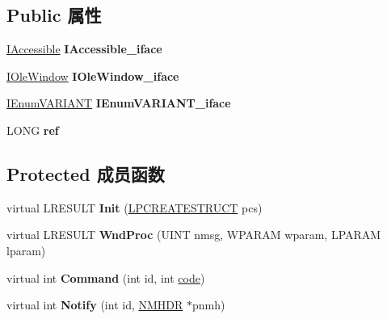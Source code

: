 \subsection*{Public 属性}
\begin{DoxyCompactItemize}
\item 
\mbox{\label{struct_window_a288cd127989ddf75b619b40c3e60745b}} 
\hyperlink{interface_i_accessible}{I\+Accessible} {\bfseries I\+Accessible\+\_\+iface}
\item 
\mbox{\label{struct_window_ab71f20b9836a12217826427101a7017d}} 
\hyperlink{interface_i_ole_window}{I\+Ole\+Window} {\bfseries I\+Ole\+Window\+\_\+iface}
\item 
\mbox{\label{struct_window_a4f1f352ac3ffb7cf71b9df651acd2923}} 
\hyperlink{interface_i_enum_v_a_r_i_a_n_t}{I\+Enum\+V\+A\+R\+I\+A\+NT} {\bfseries I\+Enum\+V\+A\+R\+I\+A\+N\+T\+\_\+iface}
\item 
\mbox{\label{struct_window_a5d080ec130deaaa0ade3c65e8ac980fc}} 
L\+O\+NG {\bfseries ref}
\end{DoxyCompactItemize}
\subsection*{Protected 成员函数}
\begin{DoxyCompactItemize}
\item 
\mbox{\label{struct_window_aeb1f493f8afb97db018b80537ec8b29f}} 
virtual L\+R\+E\+S\+U\+LT {\bfseries Init} (\hyperlink{structtag_c_r_e_a_t_e_s_t_r_u_c_t_a}{L\+P\+C\+R\+E\+A\+T\+E\+S\+T\+R\+U\+CT} pcs)
\item 
\mbox{\label{struct_window_a43883533f0ce4b72203a009e98ab93dc}} 
virtual L\+R\+E\+S\+U\+LT {\bfseries Wnd\+Proc} (U\+I\+NT nmsg, W\+P\+A\+R\+AM wparam, L\+P\+A\+R\+AM lparam)
\item 
\mbox{\label{struct_window_ac7bafca1b79a49e6f683d2260f0e87c4}} 
virtual int {\bfseries Command} (int id, int \hyperlink{structcode}{code})
\item 
\mbox{\label{struct_window_af81b35a0b4964bd8da861ed6c76230c2}} 
virtual int {\bfseries Notify} (int id, \hyperlink{structtag_n_m_h_d_r}{N\+M\+H\+DR} $\ast$pnmh)
\end{DoxyCompactItemize}
